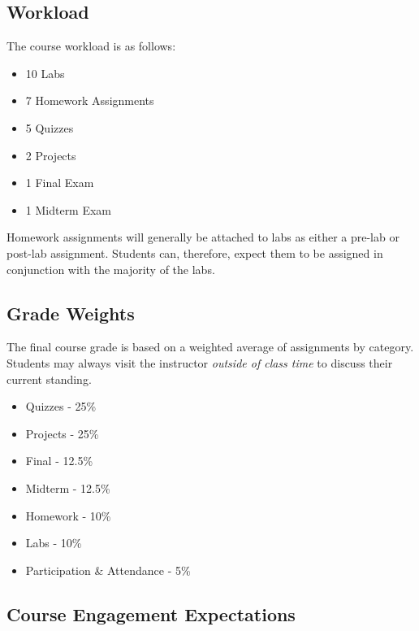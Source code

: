 \documentclass[10pt]{article}
\begin{document}
\subsection{Workload}
The course workload is as follows:
\begin{itemize}
\item 10 Labs
\item 7 Homework Assignments
\item 5 Quizzes
\item 2 Projects
\item 1 Final Exam
\item 1 Midterm Exam
\end{itemize}

Homework assignments will generally be attached to labs as either a pre-lab or post-lab assignment. Students can, therefore, expect them to be assigned in conjunction with the majority of the labs.


\subsection{Grade Weights}
The final course grade is based on a weighted average of assignments by category.  Students may always visit the instructor \textit{outside of class time} to discuss their current standing.  
\begin{itemize}
\item Quizzes - 25\%
\item Projects - 25\%
\item Final - 12.5\%
\item Midterm - 12.5\%
\item Homework - 10\%
\item Labs - 10\%
\item Participation \& Attendance - 5\%
\end{itemize} 


\subsection{Course Engagement Expectations}
\end{document}
